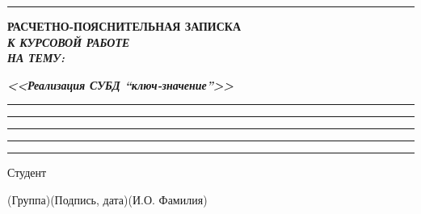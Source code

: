 \documentclass[14pt, russian]{scrartcl}
\begin{document}
\begin{titlepage}
	\vspace*{-16pt}
	\hspace{25pt}\rule{0.875\textwidth}{0.4pt}


	\vspace{3em}

	\begin{center}
		\Large \bf{РАСЧЕТНО-ПОЯСНИТЕЛЬНАЯ ЗАПИСКА\\\textbf{\textit{К КУРСОВОЙ РАБОТЕ\\НА ТЕМУ:}} \\}
	\end{center}

	\vspace*{-6ex}
	\begin{center}
		\Large{\textit{\textbf{<<Реализация СУБД ``ключ-значение''>>}}}

		\vspace*{-3ex}
		\rule{0.9\textwidth}{1.2pt}

		\vspace*{-0.2ex}

		\vspace*{-3ex}
		\vspace*{-0.2ex}
		\rule{0.9\textwidth}{1.2pt}

		\vspace*{-0.2ex}
		\rule{0.9\textwidth}{1.2pt}

		\vspace*{-0.2ex}
		\rule{0.9\textwidth}{1.2pt}

		\vspace*{-0.2ex}
		\rule{0.9\textwidth}{1.2pt}
	\end{center}

	\vspace{\fill}


	\newlength{\ML}

	\noindent Студент \underline{} \hfill \underline{ \hspace{4cm}}\quad

	\vspace{-2.1ex}
	\noindent\hspace{9ex}\scriptsize{(Группа)}\normalsize\hspace{170pt}\hspace{2ex}\scriptsize{(Подпись, дата)}\normalsize\hspace{30pt}\hspace{6ex}\scriptsize{(И.О. Фамилия)}\normalsize


\end{titlepage}
\end{document}
